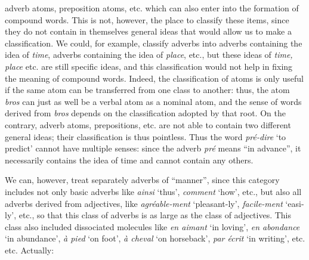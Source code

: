 \begin{sloppypar}
{{    \noindent
    \footnotesize{
    } } }
%
{\noindent
  {\small adverb atoms, preposition atoms, etc. which can also enter
    into the formation of compound words. This is not, however, the
    place to classify these items, since they do not contain in
    themselves general ideas that would allow us to make a
    classification.  We could, for example, classify adverbs into
    adverbs containing the idea of \emph{time}, adverbs containing the
    idea of \emph{place}, etc., but these ideas of \emph{time, place}
    etc. are still specific ideas, and this classification would not
    help in fixing the meaning of compound words. Indeed, the
    classification of atoms is only useful if the same atom can be
    transferred from one class to another: thus, the atom \emph{bros}
    can just as well be a verbal atom as a nominal atom, and the sense
    of words derived from \emph{bros} depends on the classification
    adopted by that root.  On the contrary, adverb atoms,
    prepositions, etc. are not able to contain two different general
    ideas; their classification is thus pointless. Thus the word
    \emph{pré-dire} `to predict' cannot have multiple senses: since
    the adverb \emph{pré} means ``in advance'', it necessarily
    contains the idea of time and cannot contain any others.

    We can, however, treat separately adverbs of ``manner'', since
    this category includes not only basic adverbs like \emph{ainsi}
    `thus', \emph{comment} `how', etc., but also all adverbs derived
    from adjectives, like \emph{agréable-ment} `pleasant-ly',
    \emph{facile-ment} `easi-ly', etc., so that this class of adverbs
    is as large as the class of adjectives. This class also included
    dissociated molecules like \emph{en aimant} `in loving', \emph{en
      abondance} `in abundance', \emph{à pied} `on foot', \emph{à
      cheval}
    `on horseback', \emph{par écrit} `in writing', etc. etc. Actually:\\[1ex]

    \noindent
    \footnotesize{
    }



}}
\end{sloppypar}
